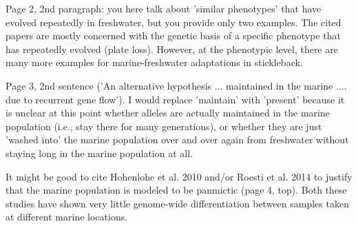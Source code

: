 \reply{
}

\begin{point}{}
Page 2, 2nd paragraph: you here talk about 'similar phenotypes' that have evolved repeatedly in freshwater, but you provide only two examples. The cited papers are mostly concerned with the genetic basis of a specific phenotype that has repeatedly evolved (plate loss). However, at the phenotypic level, there are many more examples for marine-freshwater adaptations in stickleback.
\end{point}

\reply{
}

\begin{point}{}
Page 3, 2nd sentence ('An alternative hypothesis ... maintained in the marine .... due to recurrent gene flow'). I would replace 'maintain' with 'present' because it is unclear at this point whether alleles are actually maintained in the marine population (i.e., stay there for many generations), or whether they are just 'washed into' the marine population over and over again from freshwater without staying long in the marine population at all.
\end{point}

\reply{
}


\begin{point}{}
It might be good to cite Hohenlohe et al. 2010 and/or Roesti et al. 2014 to justify that the marine population is modeled to be panmictic (page 4, top). Both these studies have shown very little genome-wide differentiation between samples taken at different marine locations.
\end{point}

\reply{
}


